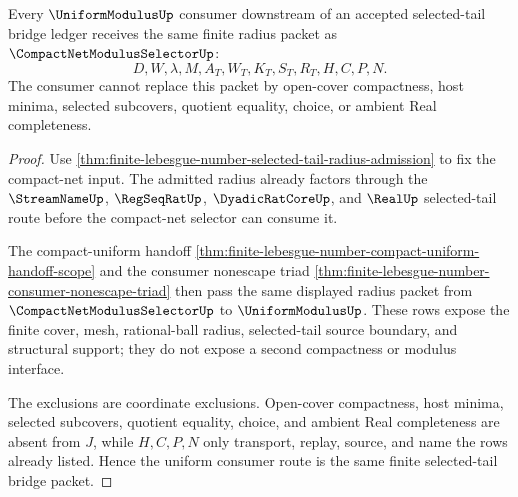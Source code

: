 \begin{theorem}
\label{thm:finite-lebesgue-number-selected-tail-uniform-consumer-route}
Every $\UniformModulusUp$ consumer downstream of an accepted selected-tail bridge ledger receives the same finite radius packet as $\CompactNetModulusSelectorUp$:
$$
D,W,\lambda,M,A_T,W_T,K_T,S_T,R_T,H,C,P,N .
$$
The consumer cannot replace this packet by open-cover compactness, host minima, selected subcovers, quotient equality, choice, or ambient Real completeness.
\end{theorem}
\begin{proof}
Use \autoref{thm:finite-lebesgue-number-selected-tail-radius-admission} to fix the compact-net input. The admitted radius already factors through the $\StreamNameUp$, $\RegSeqRatUp$, $\DyadicRatCoreUp$, and $\RealUp$ selected-tail route before the compact-net selector can consume it.

The compact-uniform handoff \autoref{thm:finite-lebesgue-number-compact-uniform-handoff-scope} and the consumer nonescape triad \autoref{thm:finite-lebesgue-number-consumer-nonescape-triad} then pass the same displayed radius packet from $\CompactNetModulusSelectorUp$ to $\UniformModulusUp$. These rows expose the finite cover, mesh, rational-ball radius, selected-tail source boundary, and structural support; they do not expose a second compactness or modulus interface.

The exclusions are coordinate exclusions. Open-cover compactness, host minima, selected subcovers, quotient equality, choice, and ambient Real completeness are absent from $J$, while $H,C,P,N$ only transport, replay, source, and name the rows already listed. Hence the uniform consumer route is the same finite selected-tail bridge packet.
\end{proof}

